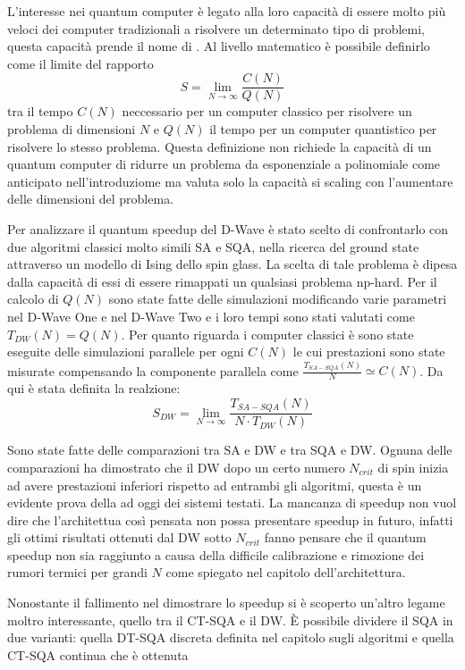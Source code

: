 L'interesse nei quantum computer è legato alla loro capacità di essere molto più veloci dei computer tradizionali a risolvere un determinato tipo di problemi, questa capacità prende il nome di . Al livello matematico è possibile definirlo\cite{DDQS} come il limite del rapporto
$$S = \lim_{N \to \infty} \frac{C(N)}{Q(N)}$$
tra il tempo $C(N)$ neccessario per un computer classico per risolvere un problema di dimensioni $N$ e $Q(N)$ il tempo per un computer quantistico per risolvere lo stesso problema. Questa definizione non richiede la capacità di un quantum computer di ridurre un problema da esponenziale a polinomiale come anticipato nell'introduziome ma valuta solo la capacità si scaling con l'aumentare delle dimensioni del problema.

Per analizzare il quantum speedup del D-Wave è stato scelto di confrontarlo con due algoritmi classici molto simili SA e SQA, nella ricerca del ground state attraverso un modello di Ising dello spin glass.
La scelta di tale problema è dipesa dalla capacità di essi di essere rimappati un qualsiasi problema np-hard. Per il calcolo di $Q(N)$ sono state fatte delle simulazioni modificando varie parametri nel D-Wave One e nel D-Wave Two e i loro tempi sono stati valutati come $T_{DW}(N) = Q(N)$. Per quanto riguarda i computer classici è sono state eseguite delle simulazioni parallele per ogni $C(N)$ le cui prestazioni sono state misurate compensando la componente parallela\cite{EQA} come
 $\frac{T_{SA-SQA}(N)}{N} \simeq C(N)$. Da qui è stata definita\cite{DDQS} la realzione:
$$S_{DW} = \lim_{N \to \infty} \frac{T_{SA-SQA}(N)}{N \cdot T_{DW}(N)}$$

Sono state fatte delle comparazioni tra SA e DW\cite{DDQS} e tra SQA e DW\cite{QVC}. Ognuna delle comparazioni ha dimostrato che il DW dopo un certo numero $N_{crit}$ di spin inizia ad avere prestazioni inferiori rispetto ad entrambi gli algoritmi, questa è un evidente prova della  ad oggi dei sistemi testati. La mancanza di speedup non vuol dire che l'architettua così pensata non possa presentare speedup in futuro, infatti gli ottimi risultati ottenuti dal DW sotto $N_{crit}$ fanno pensare che il quantum speedup non sia raggiunto a causa della difficile calibrazione e rimozione dei rumori termici per grandi $N$ come spiegato nel capitolo dell'architettura.

Nonostante il fallimento nel dimostrare lo speedup si è scoperto un'altro legame moltro interessante, quello tra il CT-SQA e il DW. È possibile dividere il SQA in due varianti: quella DT-SQA discreta definita nel capitolo sugli algoritmi e quella CT-SQA continua che è ottenuta



